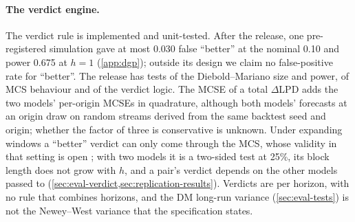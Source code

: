 \paragraph{The verdict engine.}
The verdict rule is implemented and unit-tested. After the release, one pre-registered simulation
gave at most 0.030 false ``better'' at the nominal 0.10 and power 0.675 at $h = 1$
(\cref{app:dgp}); outside its design we claim no false-positive rate for ``better''. %
The release has tests of the Diebold--Mariano size and power, of MCS behaviour and of the verdict
logic. %
The MCSE of a total $\Delta$LPD adds the two models' per-origin MCSEs in quadrature,
although both models' forecasts at an origin draw on random streams derived from the same backtest
seed and origin; whether the factor of three is conservative is unknown. %
Under expanding windows a ``better'' verdict can only come through the MCS, whose validity in that
setting is open \citep[cf.][]{hansen2011model}; with two models it is a two-sided test at 25\%, its
block length does not grow with $h$, and a pair's verdict depends on the other models passed to
 (\cref{sec:eval-verdict,sec:replication-results}). %
Verdicts are per horizon, with no rule that combines horizons, and the DM long-run variance
(\cref{sec:eval-tests}) is not the Newey--West variance \citep{newey1987simple} that the
specification states. %

